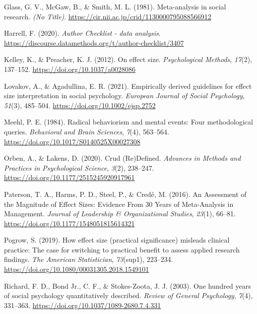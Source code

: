 \documentclass[
  man,
  colorlinks=true,linkcolor=blue,citecolor=blue,urlcolor=blue]{apa7}
\newlength{\cslhangindent}
\newlength{\cslentryspacingunit} %
\newenvironment{CSLReferences}[2] %
 {%
  \setlength{\parindent}{0pt}
  \ifodd #1
  \let\oldpar\par
  \def\par{\hangindent=\cslhangindent\oldpar}
  \fi
  \setlength{\parskip}{#2\cslentryspacingunit}
 }%
 {}
\begin{document}
\begin{CSLReferences}{1}{0}
\leavevmode{}%
Glass, G. V., McGaw, B., \& Smith, M. L. (1981). Meta-analysis in social
research. \emph{(No Title)}.
\url{https://cir.nii.ac.jp/crid/1130000795088566912}

\leavevmode{}%
Harrell, F. (2020). \emph{Author Checklist - data analysis}.
\url{https://discourse.datamethods.org/t/author-checklist/3407}

\leavevmode{}%
Kelley, K., \& Preacher, K. J. (2012). On effect size.
\emph{Psychological Methods}, \emph{17}(2), 137--152.
\url{https://doi.org/10.1037/a0028086}

\leavevmode{}%
Lovakov, A., \& Agadullina, E. R. (2021). Empirically derived guidelines
for effect size interpretation in social psychology. \emph{European
Journal of Social Psychology}, \emph{51}(3), 485--504.
\url{https://doi.org/10.1002/ejsp.2752}

\leavevmode{}%
Meehl, P. E. (1984). Radical behaviorism and mental events: Four
methodological queries. \emph{Behavioral and Brain Sciences},
\emph{7}(4), 563--564. \url{https://doi.org/10.1017/S0140525X00027308}

\leavevmode{}%
Orben, A., \& Lakens, D. (2020). Crud (Re)Defined. \emph{Advances in
Methods and Practices in Psychological Science}, \emph{3}(2), 238--247.
\url{https://doi.org/10.1177/2515245920917961}

\leavevmode{}%
Paterson, T. A., Harms, P. D., Steel, P., \& Credé, M. (2016). An
Assessment of the Magnitude of Effect Sizes: Evidence From 30 Years of
Meta-Analysis in Management. \emph{Journal of Leadership \&
Organizational Studies}, \emph{23}(1), 66--81.
\url{https://doi.org/10.1177/1548051815614321}

\leavevmode{}%
Pogrow, S. (2019). How effect size (practical significance) misleads
clinical practice: The case for switching to practical benefit to assess
applied research findings. \emph{The American Statistician},
\emph{73}(sup1), 223--234.
\url{https://doi.org/10.1080/00031305.2018.1549101}

\leavevmode{}%
Richard, F. D., Bond Jr., C. F., \& Stokes-Zoota, J. J. (2003). One
hundred years of social psychology quantitatively described.
\emph{Review of General Psychology}, \emph{7}(4), 331--363.
\url{https://doi.org/10.1037/1089-2680.7.4.331}


\end{CSLReferences}
\end{document}
